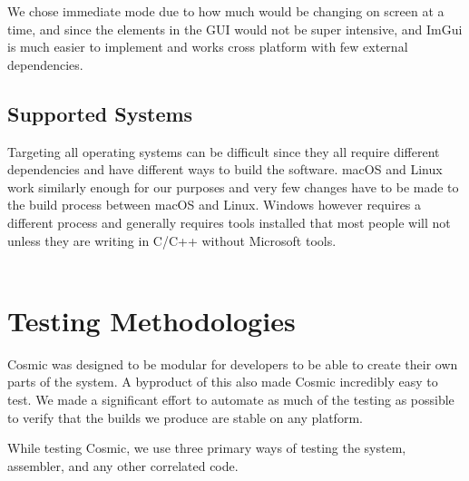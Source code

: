 \documentclass[conference]{IEEEtran}
\begin{document}
We chose immediate mode due to how much would be changing on screen at a time, and since the elements in the GUI would not be super intensive, and ImGui is much easier to implement and works cross platform with few external dependencies.




\subsection{Supported Systems}

Targeting all operating systems can be difficult since they all require different dependencies and have different ways to build the software. macOS and Linux work similarly enough for our purposes and very few changes have to be made to the build process between macOS and Linux. Windows however requires a different process and generally requires tools installed that most people will not unless they are writing in C/C++ without Microsoft tools. \\

\\

\section{Testing Methodologies}
Cosmic was designed to be modular for developers to be able to create their own parts of the system. A byproduct of this also made Cosmic incredibly easy to test. We made a significant effort to automate as much of the testing as possible to verify that the builds we produce are stable on any platform.

While testing Cosmic, we use three primary ways of testing the system, assembler, and any other correlated code.
\end{document}
